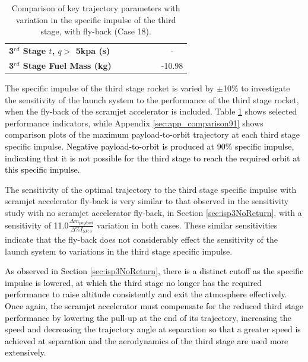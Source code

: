 \begin{table}[ht]
\begin{tabular}{l c c c c c c}
		\textbf{3$^{rd}$ Stage $t$, $q >$ 5kpa (s)}
		& \thirdqOverFiveISPThreeNinety
		& \thirdqOverFiveISPThreeNinetyFive
		& \thirdqOverFiveISPThreeStandard
		& \thirdqOverFiveISPThreeOneHundredFive
		& \thirdqOverFiveISPThreeOneHundredTen
		& -
		\\
		\textbf{3$^{rd}$ Stage Fuel Mass (kg)}
		& \thirdmFuelISPThreeNinety
		& \thirdmFuelISPThreeNinetyFive
		& \thirdmFuelISPThreeStandard
		& \thirdmFuelISPThreeOneHundredFive
		& \thirdmFuelISPThreeOneHundredTen
		&-10.98
		\\
		\hline 
	\end{tabular} 
	\caption{Comparison of key trajectory parameters with variation in the specific impulse of the third stage, with fly-back (Case 18).}
	\label{tab:isp3}
\end{table}

\noindent
The specific impulse of the third stage rocket is varied by $\pm$10\% to investigate the sensitivity of the launch system to the performance of the third stage rocket, when the fly-back of the scramjet accelerator is included. 
Table \ref{tab:isp3} shows selected performance indicators, while Appendix \ref{sec:app_comparison91} shows comparison plots of the maximum payload-to-orbit trajectory at each third stage specific impulse. \textcolor{black}{Negative payload-to-orbit is produced at 90\% specific impulse, indicating that it is not possible for the third stage to reach the required orbit at this specific impulse. }

The sensitivity of the optimal trajectory to the third stage specific impulse with scramjet accelerator fly-back is very similar to that observed in the sensitivity study with no scramjet accelerator fly-back, in Section \ref{sec:isp3NoReturn}, with a sensitivity of \textcolor{black}{11.0}$\frac{\Delta m_{payload}}{\Delta\%I_{SP,3}}$ variation in both cases. 
These similar sensitivities indicate that the fly-back does not considerably effect the sensitivity of the launch system to variations in the third stage specific impulse.

\textcolor{black}{As observed in Section \ref{sec:isp3NoReturn}, there is a distinct cutoff as the specific impulse is lowered, at which the third stage no longer has the required performance to raise altitude consistently and exit the atmosphere effectively. Once again, the scramjet accelerator must compensate for the reduced third stage performance by lowering the pull-up at the end of its trajectory, increasing the speed and decreasing the trajectory angle at separation so that a greater speed is achieved at separation and the aerodynamics of the third stage are used more extensively.} 






